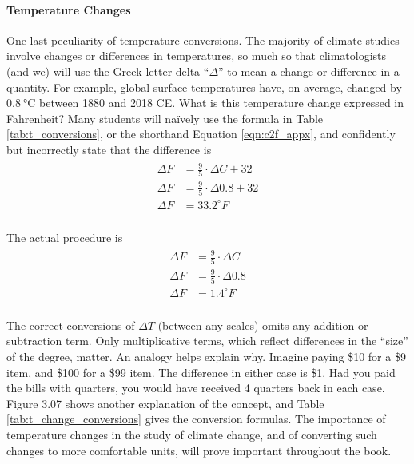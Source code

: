 \paragraph{Temperature Changes}
One last peculiarity of temperature conversions. The majority of climate studies involve changes or differences in temperatures, so much so that climatologists (and we) will use the Greek letter delta ``$\Delta$'' to mean a change or difference in a quantity. For example, global surface temperatures have, on average, changed by $\SI{0.8}{\degreeCelsius}$ between 1880 and 2018 CE. What is this temperature change expressed in Fahrenheit? Many students will na\"ively use the formula in Table \ref{tab:t_conversions}, or the shorthand Equation \ref{eqn:c2f_appx}, and confidently but incorrectly state that the difference is
\begin{align}
\label{eqn:wrong_dT}
\begin{split}
	\Delta F&=\frac{9}{5}\cdot  \Delta C+ 32\\
	\Delta F&=\frac{9}{5}\cdot  \Delta 0.8+ 32\\
	\Delta F&=33.2^{\circ} F\\
\end{split}
\end{align}

The actual procedure is 
\begin{align}
\label{eqn:correct_dT}
\begin{split}
	\Delta F&=\frac{9}{5}\cdot  \Delta C\\
	\Delta F&=\frac{9}{5}\cdot  \Delta 0.8\\
	\Delta F&=1.4^{\circ} F\\
\end{split}
\end{align}

The correct conversions of $\Delta T$ (between any scales) omits any addition or subtraction term. Only multiplicative terms, which reflect differences in the ``size'' of the degree, matter. An analogy helps explain why. Imagine paying \$10 for a \$9 item, and \$100 for a \$99 item. The difference in either case is \$1. Had you paid the bills with quarters, you would have received 4 quarters back in each case. Figure 3.07 shows another explanation of the concept, and Table \ref{tab:t_change_conversions} gives the conversion formulas. The importance of temperature changes in the study of climate change, and of converting such changes to more comfortable units, will prove important throughout the book.  

